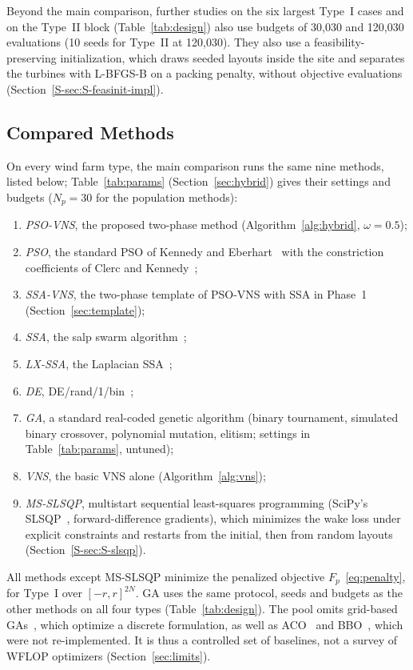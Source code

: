 Beyond the main comparison, further studies on the six largest Type~I cases and on the Type~II block (Table~\ref{tab:design}) also use budgets of 30,030 and 120,030 evaluations (10 seeds for Type~II at 120,030). They also use a feasibility-preserving initialization, which draws seeded layouts inside the site and separates the turbines with L-BFGS-B on a packing penalty, without objective evaluations (Section~\ref{S-sec:S-feasinit-impl}).

\subsection{Compared Methods}
\label{sec:setup-methods}
On every wind farm type, the main comparison runs the same nine methods, listed below; Table~\ref{tab:params} (Section~\ref{sec:hybrid}) gives their settings and budgets ($N_p=30$ for the population methods):
\begin{enumerate}
\item \emph{PSO-VNS}, the proposed two-phase method (Algorithm~\ref{alg:hybrid}, $\omega=0.5$);
\item \emph{PSO}, the standard PSO of Kennedy and Eberhart~\cite{Kennedy1995} with the constriction coefficients of Clerc and Kennedy~\cite{Clerc2002};
\item \emph{SSA-VNS}, the two-phase template of PSO-VNS with SSA in Phase~1 (Section~\ref{sec:template});
\item \emph{SSA}, the salp swarm algorithm~\cite{Mirjalili2017};
\item \emph{LX-SSA}, the Laplacian SSA~\cite{Solanki2023};
\item \emph{DE}, DE/rand/1/bin~\cite{Storn1997};
\item \emph{GA}, a standard real-coded genetic algorithm (binary tournament, simulated binary crossover, polynomial mutation, elitism; settings in Table~\ref{tab:params}, untuned);
\item \emph{VNS}, the basic VNS alone (Algorithm~\ref{alg:vns});
\item \emph{MS-SLSQP}, multistart sequential least-squares programming (SciPy's SLSQP~\cite{Kraft1988}, forward-difference gradients), which minimizes the wake loss under explicit constraints and restarts from the initial, then from random layouts (Section~\ref{S-sec:S-slsqp}).
\end{enumerate}
All methods except MS-SLSQP minimize the penalized objective $F_p$~\eqref{eq:penalty}, for Type~I over $[-r,r]^{2N}$. GA uses the same protocol, seeds and budgets as the other methods on all four types (Table~\ref{tab:design}). The pool omits grid-based GAs~\cite{Mosetti1994,Grady2005}, which optimize a discrete formulation, as well as ACO~\cite{Eroglu2012} and BBO~\cite{Bansal2017}, which were not re-implemented. It is thus a controlled set of baselines, not a survey of WFLOP optimizers (Section~\ref{sec:limits}).


